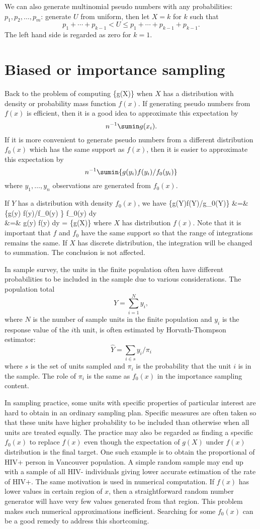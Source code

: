 We can also generate multinomial pseudo numbers with
any probabilities: $p_1, p_2, \ldots, p_m$: generate $U$ from
uniform, then let $X = k$ for $k$ such that
\[
p_1+ \cdots + p_{k-1} < U \leq p_1+ \cdots + p_{k-1} + p_{k-1}.
\]
The left hand side is regarded as zero for $k=1$.

\section{ Biased or importance sampling}
Back to the problem of computing \bbE\{g(X)\} when $X$ has
a distribution with density or probability mass function $f(x)$.
If generating pseudo numbers from $f(x)$ is efficient, then
it is a good idea to approximate this expectation by
\[
n^{-1} \sumin g(x_i).
\]
If it is more convenient to generate pseudo numbers from a different
distribution $f_0(x)$ which has the same support as $f(x)$, then
it is easier to approximate this expectation by
\[
n^{-1} \sumin \{ g(y_i)f(y_i) /f_0(y_i) \}
\]
where $y_1, \ldots, y_n$ observations are generated from $f_0(x)$.

If $Y$ has a distribution with  density $f_0(x)$, we have
\bea
\bbE\{g(Y)f(Y)/g_0(Y)\}
&=&
\int \{g(y) f(y)/f_0(y) \} f_0(y) dy\\
&=&
\int g(y) f(y) dy
=
\bbE\{g(X)\}
\eea
where $X$ has distribution $f(x)$.
Note that it is important that $f$ and $f_0$ have the same
support so that the range of integrations remains the same.
If $X$ has discrete distribution, the integration will be changed
to summation. The conclusion is not affected.

In sample survey, the units in the finite population often have
different probabilities to be included in the sample due to
various considerations. The population total
\[
Y = \sum_{i=1}^N y_i,
\]
where $N$ is the number of sample units in the finite population
and $y_i$ is the response value of the $i$th unit,
is often estimated by Horvath-Thompson estimator:
\[
\hat{Y} = \sum_{i \in s} y_i/\pi_i
\]
where $s$ is the set of units sampled and $\pi_i$ is the
probability that the unit $i$ is in the sample. The role of
$\pi_i$ is the same as $f_0(x)$ in the importance sampling
content.

In sampling practice, some units with specific properties of
particular interest are hard to obtain in an ordinary sampling
plan. Specific measures are often taken so that these units
have higher probability to be included than otherwise when
all units are treated equally. The practice may also be regarded
as finding a specific $f_0(x)$ to replace $f(x)$ even though
the expectation of $g(X)$ under $f(x)$ distribution is the
final target. One such example is to obtain the proportional
of HIV+ person in Vancouver population. A simple random
sample may end up with a sample of all HIV- individuals giving
lower accurate estimation of the rate of HIV+.
The same motivation is used in numerical computation.
If $f(x)$ has lower values in certain region of $x$, then
a straightforward random number generator will have
very few values generated from that region. This problem
makes such numerical approximations inefficient.
Searching for some $f_0(x)$ can be a good remedy to
address this shortcoming.


